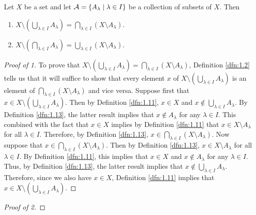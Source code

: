 \documentclass[../main.tex]{subfiles}
\begin{document}
\begin{theorem}\label{trm:1.14}
    Let $X$ be a set and let $\mathcal{A}=\{A_\lambda\mid\lambda\in I\}$ be a collection of subsets of $X$. Then
    \begin{enumerate}[ref={\thetheorem-\arabic*}]
        \item \label{trm:1.14a}$X\setminus\left( \bigcup_{\lambda\in I}A_\lambda \right) = \bigcap_{\lambda\in I}(X\setminus A_\lambda)$.
        \item \label{trm:1.14b}$X\setminus\left( \bigcap_{\lambda\in I}A_\lambda \right) = \bigcup_{\lambda\in I}(X\setminus A_\lambda)$.
    \end{enumerate}
    \begin{proof}[Proof of 1]
        To prove that $X\setminus\left( \bigcup_{\lambda\in I}A_\lambda \right)=\bigcap_{\lambda\in I}(X\setminus A_\lambda)$, Definition \ref{dfn:1.2} tells us that it will suffice to show that every element $x$ of $X\setminus\left( \bigcup_{\lambda\in I}A_\lambda \right)$ is an element of $\bigcap_{\lambda\in I}(X\setminus A_\lambda)$ and vice versa. Suppose first that $x\in X\setminus\left( \bigcup_{\lambda\in I}A_\lambda \right)$. Then by Definition \ref{dfn:1.11}, $x\in X$ and $x\notin\bigcup_{\lambda\in I}A_\lambda$. By Definition \ref{dfn:1.13}, the latter result implies that $x\notin A_\lambda$ for any $\lambda\in I$. This combined with the fact that $x\in X$ implies by Definition \ref{dfn:1.11} that $x\in X\setminus A_\lambda$ for all $\lambda\in I$. Therefore, by Definition \ref{dfn:1.13}, $x\in\bigcap_{\lambda\in I}(X\setminus A_\lambda)$. Now suppose that $x\in\bigcap_{\lambda\in I}(X\setminus A_\lambda)$. Then by Definition \ref{dfn:1.13}, $x\in X\setminus A_\lambda$ for all $\lambda\in I$. By Definition \ref{dfn:1.11}, this implies that $x\in X$ and $x\notin A_\lambda$ for any $\lambda\in I$. Thus, by Definition \ref{dfn:1.13}, the latter result implies that $x\notin\bigcup_{\lambda\in I}A_\lambda$. Therefore, since we also have $x\in X$, Definition \ref{dfn:1.11} implies that $x\in X\setminus\left( \bigcup_{\lambda\in I}A_\lambda \right)$.
    \end{proof}
    \begin{proof}[Proof of 2]

\end{proof}
\end{theorem}
\end{document}
